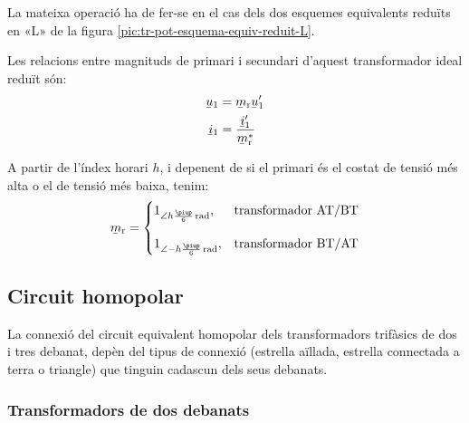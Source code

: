 \break
\begin{center}
    
    \label{fig:esq-reduit-T-complex}
\end{center}

La mateixa operació ha de fer-se en el cas dels dos esquemes equivalents reduïts en «L» de la figura \vref{pic:tr-pot-esquema-equiv-reduit-L}.

Les relacions entre magnituds de primari i secundari d'aquest transformador ideal reduït són:
\begin{subequations}
\begin{align}
    \cmplx{u}_1 &= \cmplx{m}\ped{r}\cmplx{u}'_1 \label{eq:UmU-reduit}\\
    \cmplx{i}_1 &= \frac{\cmplx{i}'_1}{\cmplx{m}^*\ped{r}} \label{eq:ImI-reduit}
\end{align}
\end{subequations}

A partir de l'índex horari $h$, i depenent de si el primari és el costat de tensió més alta o el de tensió més baixa, tenim:
\begin{equation}
\cmplx{m}\ped{r} = \begin{cases}
      1_{\angle h\frac{\piup}{6}\unit{\,rad}}, & \text{transformador AT/BT}\\[2.7ex]
      1_{\angle -h\frac{\piup}{6}\unit{\,rad}}, & \text{transformador BT/AT}
\end{cases}
\label{eq:rel-transf-cmplx-reduit}
\end{equation}


\subsection{Circuit homopolar}\label{sec:circuit_homopolar}

La connexió del circuit equivalent homopolar dels transformadors trifàsics de dos i tres debanat, depèn del tipus de connexió (estrella aïllada, estrella connectada a terra o triangle) que tinguin cadascun dels seus debanats.

\subsubsection{Transformadors de dos debanats}\label{sec:cir-hom-2-deb}


